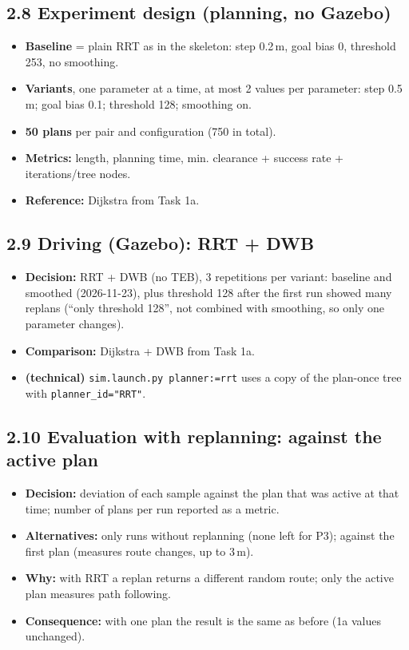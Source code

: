 \documentclass[10pt]{article}
\newcommand{\pkg}[1]{\texttt{#1}}
\begin{document}
\subsection*{2.8 Experiment design (planning, no Gazebo)}
\begin{itemize}
  \item \textbf{Baseline} = plain RRT as in the skeleton: step 0.2\,m, goal bias 0, threshold 253, no smoothing.
  \item \textbf{Variants}, one parameter at a time, at most 2 values per parameter: step 0.5\,m; goal bias 0.1; threshold 128; smoothing on.
  \item \textbf{50 plans} per pair and configuration (750 in total).
  \item \textbf{Metrics:} length, planning time, min. clearance + success rate + iterations/tree nodes.
  \item \textbf{Reference:} Dijkstra from Task 1a.
\end{itemize}

\subsection*{2.9 Driving (Gazebo): RRT + DWB}
\begin{itemize}
  \item \textbf{Decision:} RRT + DWB (no TEB), 3 repetitions per variant: baseline and smoothed (2026-11-23), plus threshold 128 after the first run showed many replans (``only threshold 128'', not combined with smoothing, so only one parameter changes).
  \item \textbf{Comparison:} Dijkstra + DWB from Task 1a.
  \item \textbf{(technical)} \pkg{sim.launch.py planner:=rrt} uses a copy of the plan-once tree with \pkg{planner\_id="RRT"}.
\end{itemize}

\subsection*{2.10 Evaluation with replanning: against the active plan}
\begin{itemize}
  \item \textbf{Decision:} deviation of each sample against the plan that was active at that time; number of plans per run reported as a metric.
  \item \textbf{Alternatives:} only runs without replanning (none left for P3); against the first plan (measures route changes, up to 3\,m).
  \item \textbf{Why:} with RRT a replan returns a different random route; only the active plan measures path following.
  \item \textbf{Consequence:} with one plan the result is the same as before (1a values unchanged).
\end{itemize}
\end{document}
